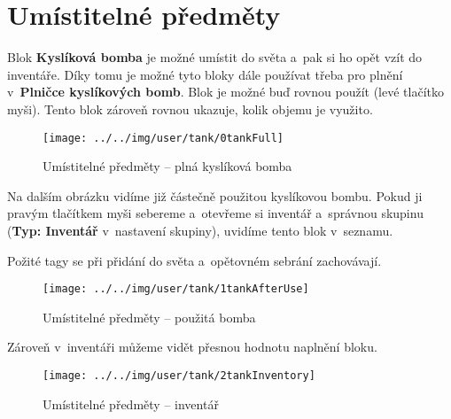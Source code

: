 
\section{Umístitelné předměty}

Blok \textbf{Kyslíková bomba} je možné umístit do světa a~pak si ho opět vzít do inventáře. Díky tomu je možné tyto bloky dále používat třeba pro plnění v~\textbf{Plničce kyslíkových bomb}.
Blok je možné buď rovnou použít (levé tlačítko myši).
Tento blok zároveň rovnou ukazuje, kolik objemu je využito.

\begin{figure}[!ht]\centering
\texttt{[image: ../../img/user/tank/0tankFull]}

\caption{Umístitelné předměty -- plná kyslíková bomba}
\label{fig:user_tank_0tankFull}

\end{figure}

\FloatBarrier

Na dalším obrázku vidíme již částečně použitou kyslíkovou bombu. Pokud ji pravým tlačítkem myši sebereme a~otevřeme si inventář a~správnou skupinu (\textbf{Typ: Inventář} v~nastavení skupiny), uvidíme tento blok v~seznamu.

Požité tagy se při přidání do světa a~opětovném sebrání zachovávají.

\begin{figure}[!ht]\centering
\texttt{[image: ../../img/user/tank/1tankAfterUse]}

\caption{Umístitelné předměty -- použitá bomba}
\label{fig:user_tank_1tankAfterUse}

\end{figure}

\FloatBarrier

Zároveň v~inventáři můžeme vidět přesnou hodnotu naplnění bloku.

\begin{figure}[!ht]\centering
\texttt{[image: ../../img/user/tank/2tankInventory]}

\caption{Umístitelné předměty -- inventář}
\label{fig:user_tank_2tankInventory}

\end{figure}



\FloatBarrier